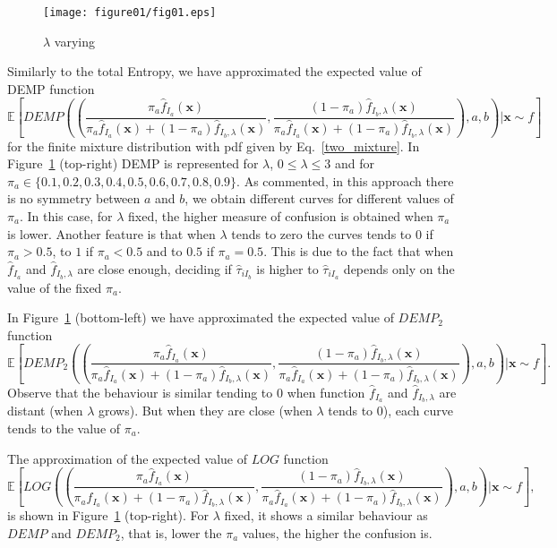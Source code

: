 \documentclass[10pt, a4paper]{article}
\newcommand{\m}[1]{\boldsymbol{#1}}
\begin{document}
\begin{figure}[!t]
\centering
\texttt{[image: figure01/fig01.eps]}
\caption{$\lambda$ varying}
\label{fig:mu_varying}
\end{figure}


Similarly to the total Entropy, we have approximated the expected value of DEMP function
\[
\mathbb{E}\left[DEMP \left(
 \left( 
 \frac{\pi_a \hat{f}_{I_a}(\m x)}{\pi_a \hat{f}_{I_a}(\m x) + (1-\pi_a) \hat{f}_{I_b, \lambda}(\m x)}, 
 \frac{(1-\pi_a) \hat{f}_{I_b, \lambda}(\m x)}{\pi_a \hat{f}_{I_a}(\m x) + (1-\pi_a) \hat{f}_{I_b, \lambda}(\m x)} \right), a, b\right) | \m x \sim f \right]
\]
for the finite mixture distribution with pdf given by Eq.~\ref{two_mixture}.
In Figure~\ref{fig:mu_varying} (top-right) DEMP is represented for $\lambda$, $0 \leq \lambda \leq 3$ and for $\pi_a \in \{ 0.1, 0.2, 0.3, 0.4, 0.5, 0.6, 0.7, 0.8, 0.9\}$. As commented, in this approach there is no symmetry between $a$ and $b$, we obtain different curves for different values of $\pi_a$. In this case, for $\lambda$ fixed, the higher measure of confusion is obtained when $\pi_a$ is lower. Another feature is that when $\lambda$ tends to zero the curves tends to $0$ if $\pi_a > 0.5$, to $1$ if $\pi_a < 0.5$ and to $0.5$ if $\pi_a = 0.5$. This is due to the fact that when $\hat{f}_{I_a}$ and $\hat{f}_{I_b, \lambda}$ are close enough, deciding if $\hat{\tau}_{i I_{b}}$ is higher to $\hat{\tau}_{i I_{a}}$ depends only on the value of the fixed $\pi_a$.


In Figure~\ref{fig:mu_varying} (bottom-left)  we have approximated the expected value of $DEMP_2$ function
\[
\mathbb{E}\left[DEMP_2 \left(
 \left( 
 \frac{\pi_a \hat{f}_{I_a}(\m x)}{\pi_a \hat{f}_{I_a}(\m x) + (1-\pi_a) \hat{f}_{I_b, \lambda}(\m x)}, 
 \frac{(1-\pi_a) \hat{f}_{I_b, \lambda}(\m x)}{\pi_a \hat{f}_{I_a}(\m x) + (1-\pi_a) \hat{f}_{I_b, \lambda}(\m x)} \right), a, b\right) | \m x \sim f \right].
\]
Observe that the behaviour is similar tending to 0 when function $\hat{f}_{I_a}$ and $\hat{f}_{I_b, \lambda}$ are distant (when $\lambda$ grows). But when they are close (when $\lambda$ tends to 0), each curve tends to the value of $\pi_a$.


The approximation of the expected value of $LOG$ function
\[
\mathbb{E}\left[LOG \left(
 \left( 
 \frac{\pi_a \hat{f}_{I_a}(\m x)}{\pi_a \hat{f}_{I_a}(\m x) + (1-\pi_a) \hat{f}_{I_b, \lambda}(\m x)}, 
 \frac{(1-\pi_a) \hat{f}_{I_b, \lambda}(\m x)}{\pi_a \hat{f}_{I_a}(\m x) + (1-\pi_a) \hat{f}_{I_b, \lambda}(\m x)} \right), a, b\right) | \m x \sim f \right],
\]
is shown in Figure~\ref{fig:mu_varying} (top-right). For $\lambda$ fixed, it shows a similar behaviour as $DEMP$ and $DEMP_2$, that is, lower the $\pi_a$ values, the higher the confusion is. 
\end{document}
